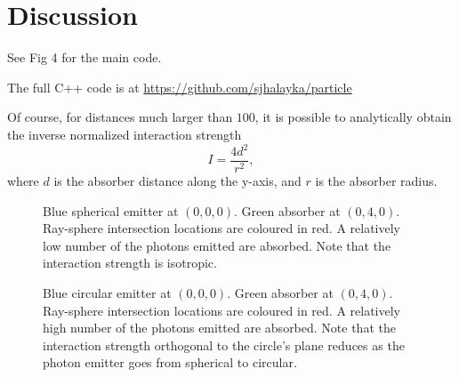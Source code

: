 \documentclass[12pt]{article}
\begin{document}
\section{Discussion}

See Fig 4 for the main code.

The full C++ code is at \url{https://github.com/sjhalayka/particle}

Of course, for distances much larger than $100$, it is possible to analytically obtain the inverse normalized interaction strength
\begin{equation}
I = \frac{4 d^2}{r^2},
\end{equation}
where $d$ is the absorber distance along the y-axis, and $r$ is the absorber radius.




\pagebreak





\begin{figure} 
\centering
{}
  \caption{
Blue spherical emitter at $(0, 0, 0)$. 
Green absorber at $(0, 4, 0)$. 
Ray-sphere intersection locations are coloured in red.
A relatively low number of the photons emitted are absorbed.
Note that the interaction strength is isotropic.
}
\end{figure}


\begin{figure} 
\centering
{}
  \caption{
Blue circular emitter at $(0, 0, 0)$. 
Green absorber at $(0, 4, 0)$. 
Ray-sphere intersection locations are coloured in red.
A relatively high number of the photons emitted are absorbed.
Note that the interaction strength orthogonal to the circle's plane reduces as the photon emitter goes from spherical to circular.
}
\end{figure}
\end{document}
